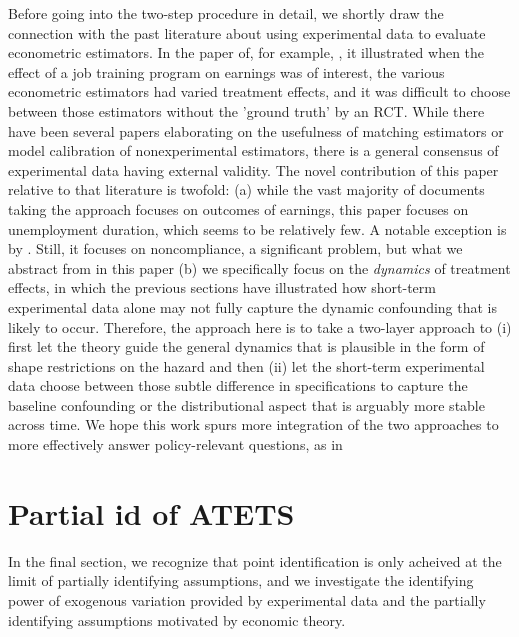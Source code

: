 \documentclass{article}
\begin{document}
             Before going into the two-step procedure in detail, we shortly draw the connection with the past literature about using experimental data to evaluate econometric estimators. In the paper of, for example, \cite{lalonde1986evaluating}, it illustrated when the effect of a job training program on earnings was of interest, the various econometric estimators had varied treatment effects, and it was difficult to choose between those estimators without the 'ground truth' by an RCT. While there have been several papers elaborating on the usefulness of matching estimators or model calibration \cite{heckman1997matching,heckman1998characterizing} of nonexperimental estimators, there is a general consensus of experimental data having external validity.
             The novel contribution of this paper relative to that literature is twofold: (a) while the vast majority of documents taking the \cite{lalonde 1986} approach focuses on outcomes of earnings, this paper focuses on unemployment duration, which seems to be relatively few. A notable exception is by \cite{ham1996effect}. Still, it focuses on noncompliance, a significant problem, but what we abstract from in this paper (b) we specifically focus on the \textit{dynamics  }of treatment effects, in which the previous sections have illustrated how short-term experimental data alone may not fully capture the dynamic confounding that is likely to occur. Therefore, the approach here is to take a two-layer approach to (i) first let the theory guide the general dynamics that is plausible in the form of shape restrictions on the hazard and then (ii) let the short-term experimental data choose between those subtle difference in specifications to capture the baseline confounding or the distributional aspect that is arguably more stable across time. We hope this work spurs more integration of the two approaches to more effectively answer policy-relevant questions, as in \cite{todd2020best}
    




\section{Partial id of ATETS}

    In the final section, we recognize that point identification is only acheived at the limit of partially identifying assumptions, and we investigate the identifying power of exogenous variation provided by experimental data and the partially identifying assumptions motivated by economic theory.
\end{document}
